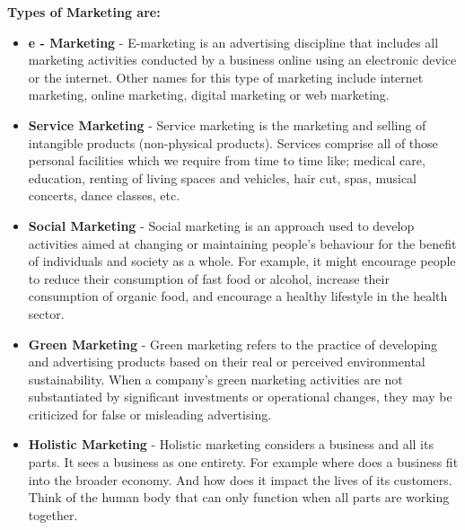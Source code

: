 \documentclass{article}
\begin{document}
\large{\textbf{Types of Marketing are: }}
\begin{itemize}
    \item {\textbf{e - Marketing}} - E-marketing is an advertising discipline that includes all marketing activities conducted by a business online using an electronic device or the internet. Other names for this type of marketing include internet marketing, online marketing, digital marketing or web marketing.
    \item {\textbf{Service Marketing}} - Service marketing is the marketing and selling of intangible products (non-physical products). Services comprise all of those personal facilities which we require from time to time like; medical care, education, renting of living spaces and vehicles, hair cut, spas, musical concerts, dance classes, etc.
    \item {\textbf{Social Marketing}} - Social marketing is an approach used to develop activities aimed at changing or maintaining people's behaviour for the benefit of individuals and society as a whole. For example, it might encourage people to reduce their consumption of fast food or alcohol, increase their consumption of organic food, and encourage a healthy lifestyle in the health sector.
    \item {\textbf{Green Marketing}} - Green marketing refers to the practice of developing and advertising products based on their real or perceived environmental sustainability. When a company's green marketing activities are not substantiated by significant investments or operational changes, they may be criticized for false or misleading advertising.
    \item {\textbf{Holistic Marketing}} - Holistic marketing considers a business and all its parts. It sees a business as one entirety. For example where does a business fit into the broader economy. And how does it impact the lives of its customers. Think of the human body that can only function when all parts are working together.
\end{itemize}
\end{document}
